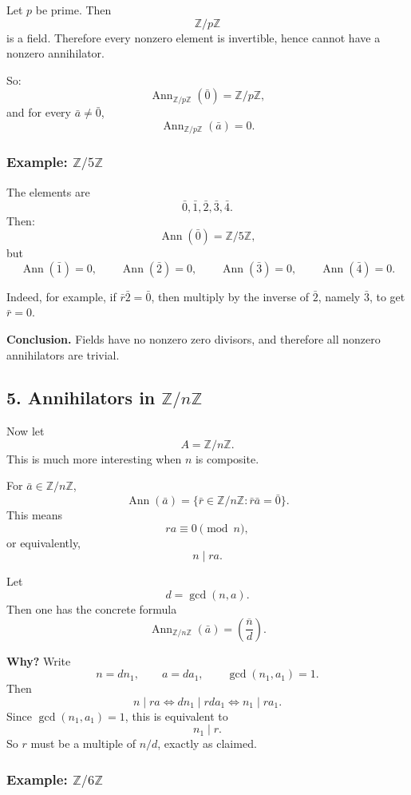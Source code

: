 \documentclass[12pt,a4paper,oneside]{report}
\DeclareMathOperator{\Ann}{Ann}
\theoremstyle{notespace}
\begin{document}
	Let \(p\) be prime. Then
	\[
	\mathbb Z/p\mathbb Z
	\]
	is a field. Therefore every nonzero element is invertible, hence cannot have a nonzero annihilator.
	
	So:
	\[
	\Ann_{\mathbb Z/p\mathbb Z}(\bar 0)=\mathbb Z/p\mathbb Z,
	\]
	and for every \(\bar a\neq \bar 0\),
	\[
	\Ann_{\mathbb Z/p\mathbb Z}(\bar a)=0.
	\]
	
	\subsubsection{Example: \(\mathbb Z/5\mathbb Z\)}
	The elements are
	\[
	\bar 0,\bar 1,\bar 2,\bar 3,\bar 4.
	\]
	Then:
	\[
	\Ann(\bar 0)=\mathbb Z/5\mathbb Z,
	\]
	but
	\[
	\Ann(\bar 1)=0,\qquad \Ann(\bar 2)=0,\qquad \Ann(\bar 3)=0,\qquad \Ann(\bar 4)=0.
	\]
	
	Indeed, for example, if \(\bar r\bar 2=\bar 0\), then multiply by the inverse of \(\bar 2\), namely \(\bar 3\), to get \(\bar r=0\).
	
	\medskip
	
	\noindent
	\textbf{Conclusion.}
	Fields have no nonzero zero divisors, and therefore all nonzero annihilators are trivial.
	
	\subsection{5. Annihilators in \(\mathbb Z/n\mathbb Z\)}
	
	Now let
	\[
	A=\mathbb Z/n\mathbb Z.
	\]
	This is much more interesting when \(n\) is composite.
	
	For \(\bar a\in \mathbb Z/n\mathbb Z\),
	\[
	\Ann(\bar a)=\{\bar r\in \mathbb Z/n\mathbb Z:\bar r\bar a=\bar 0\}.
	\]
	This means
	\[
	ra\equiv 0\pmod n,
	\]
	or equivalently,
	\[
	n\mid ra.
	\]
	
	Let
	\[
	d=\gcd(n,a).
	\]
	Then one has the concrete formula
	\[
	\Ann_{\mathbb Z/n\mathbb Z}(\bar a)=\left(\overline{\frac{n}{d}}\right).
	\]
	
	\medskip
	
	\noindent
	\textbf{Why?}
	Write
	\[
	n=d n_1,\qquad a=d a_1,\qquad \gcd(n_1,a_1)=1.
	\]
	Then
	\[
	n\mid ra
	\iff
	d n_1\mid r d a_1
	\iff
	n_1\mid r a_1.
	\]
	Since \(\gcd(n_1,a_1)=1\), this is equivalent to
	\[
	n_1\mid r.
	\]
	So \(r\) must be a multiple of \(n/d\), exactly as claimed.
	
	\subsubsection{Example: \(\mathbb Z/6\mathbb Z\)}
	
\end{document}
